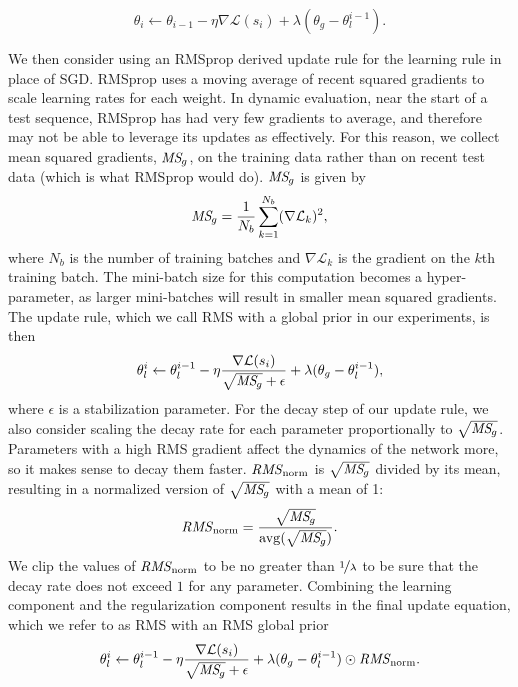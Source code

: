 \documentclass{article}
\newcommand{\rmsnorm}{\mathit{RMS}_\mathrm{\kern-0.5pt norm}}
\newcommand{\MSg}{\mathit{MS}_{\kern-1.2pt g}}
\begin{document}
\begin{equation}
\theta_i \leftarrow \theta_{i-1} - \eta \nabla \mathcal{L}(s_i) + \lambda (\theta_g - \theta^{i-1}_l).
\end{equation}

We then consider using an RMSprop \citep{tieleman2012} derived update rule for the learning rule in place of SGD\@. RMSprop uses a moving average of recent squared gradients to scale learning rates for each weight. In dynamic evaluation, near the start of a test sequence, RMSprop has had very few gradients to average, and therefore may not be able to leverage its updates as effectively. For this reason, we collect mean squared gradients, $\MSg$, on the training data rather than on recent test data (which is what RMSprop would do). $\MSg$ is given by
\begin{equation}
\MSg =  \frac{1}{N_b}\sum_{k=1}^{N_b}(\nabla \mathcal{L}_k)^2,
\end{equation}
where $N_b$ is the number of training batches and $\nabla \mathcal{L}_k$ is the gradient on the $k$th training batch. The mini-batch size for this computation becomes a hyper-parameter, as larger mini-batches will result in smaller mean squared gradients. The update rule, which we call RMS with a global prior in our experiments, is then
\begin{equation}
\theta^i_l \leftarrow \theta^{i-1}_l - \eta \frac{\nabla \mathcal{L}(s_i)}{\sqrt{\MSg}+\epsilon} + \lambda (\theta_g - \theta^{i-1}_l) ,
\end{equation}
where $\epsilon$ is a stabilization parameter. For the decay step of our update rule, we also consider scaling the decay rate for each parameter proportionally to $\sqrt{\MSg}$. Parameters with a high RMS gradient affect the dynamics of the network more, so it makes sense to decay them faster. $\rmsnorm$ is $\sqrt{\MSg}$ divided by its mean, resulting in a normalized version of $\sqrt{\MSg}$ with a mean of 1:
\begin{equation}
    \rmsnorm = \frac{\sqrt{\MSg}}{\mathrm{avg}(\sqrt{\MSg})}.
\end{equation}
We clip the values of $\rmsnorm$ to be no greater than $\nicefrac{1}{\lambda}$ to be sure that the decay rate does not exceed $1$ for any parameter. Combining the learning component and the regularization component results in the final update equation, which we refer to as RMS with an RMS global prior
\begin{equation}
\theta^i_l \leftarrow \theta^{i-1}_l - \eta \frac{\nabla \mathcal{L}(s_i)}{\sqrt{\MSg}+\epsilon} + \lambda (\theta_g - \theta^{i-1}_l) \odot \rmsnorm .
\end{equation}
\end{document}
